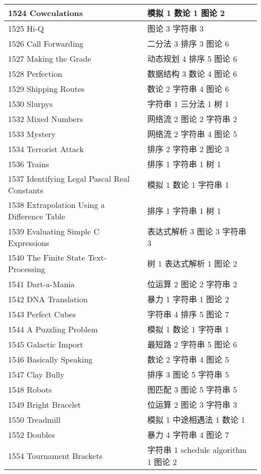 \begin{longtable}{| p{} | p{} |}
 1524 Cowculations  & 模拟 1 数论 1 图论 2 \\ \hline
 1525 Hi-Q  & 图论 3 字符串 3 \\ \hline
 1526 Call Forwarding  & 二分法 3 排序 3 图论 6 \\ \hline
 1527 Making the Grade  & 动态规划 4 排序 5 图论 6 \\ \hline
 1528 Perfection  & 数据结构 3 数论 4 图论 6 \\ \hline
 1529 Shipping Routes  & 数论 2 字符串 4 图论 6 \\ \hline
 1530 Slurpys  & 字符串 1 三分法 1 树 1 \\ \hline
 1532 Mixed Numbers  & 网络流 2 图论 2 字符串 2 \\ \hline
 1533 Mystery  & 网络流 2 字符串 4 图论 5 \\ \hline
 1534 Terrorist Attack  & 排序 2 字符串 2 图论 3 \\ \hline
 1536 Trains  & 排序 1 字符串 1 树 1 \\ \hline
 1537 Identifying Legal Pascal Real Constants  & 模拟 1 数论 1 字符串 1 \\ \hline
 1538 Extrapolation Using a Difference Table  & 排序 1 字符串 1 树 1 \\ \hline
 1539 Evaluating Simple C Expressions  & 表达式解析 3 图论 3 字符串 3 \\ \hline
 1540 The Finite State Text-Processing  & 树 1 表达式解析 1 图论 2 \\ \hline
 1541 Dart-a-Mania  & 位运算 2 图论 2 字符串 2 \\ \hline
 1542 DNA Translation  & 暴力 1 字符串 1 图论 2 \\ \hline
 1543 Perfect Cubes  & 字符串 4 排序 5 图论 7 \\ \hline
 1544 A Puzzling Problem  & 模拟 1 数论 1 字符串 1 \\ \hline
 1545 Galactic Import  & 最短路 2 字符串 5 图论 6 \\ \hline
 1546 Basically Speaking  & 数论 2 字符串 4 图论 5 \\ \hline
 1547 Clay Bully  & 排序 3 图论 5 字符串 5 \\ \hline
 1548 Robots  & 图匹配 3 图论 5 字符串 5 \\ \hline
 1549 Bright Bracelet  & 位运算 2 图论 3 字符串 3 \\ \hline
 1550 Treadmill  & 模拟 1 中途相遇法 1 数论 1 \\ \hline
 1552 Doubles  & 暴力 4 字符串 4 图论 7 \\ \hline
 1554 Tournament Brackets  & 字符串 1 schedule algorithm 1 图论 2 \\ \hline

\end{longtable}
